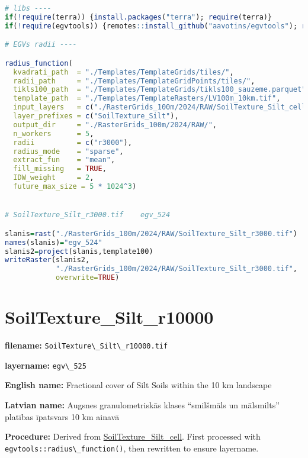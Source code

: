 \documentclass[
]{book}
\newcommand{\passthrough}[1]{#1}
\begin{document}
\begin{lstlisting}[language=R]
# libs ----
if(!require(terra)) {install.packages("terra"); require(terra)}
if(!require(egvtools)) {remotes::install_github("aavotins/egvtools"); require(egvtools)}

# EGVs radii ----

radius_function(
  kvadrati_path  = "./Templates/TemplateGrids/tiles/",
  radii_path     = "./Templates/TemplateGridPoints/tiles/",
  tikls100_path  = "./Templates/TemplateGrids/tikls100_sauzeme.parquet",
  template_path  = "./Templates/TemplateRasters/LV100m_10km.tif",
  input_layers   = c("./RasterGrids_100m/2024/RAW/SoilTexture_Silt_cell.tif"),
  layer_prefixes = c("SoilTexture_Silt"),
  output_dir     = "./RasterGrids_100m/2024/RAW/",
  n_workers      = 5,
  radii          = c("r3000"),
  radius_mode    = "sparse",
  extract_fun    = "mean",
  fill_missing   = TRUE,
  IDW_weight     = 2,
  future_max_size = 5 * 1024^3)


# SoilTexture_Silt_r3000.tif    egv_524

slanis=rast("./RasterGrids_100m/2024/RAW/SoilTexture_Silt_r3000.tif")
names(slanis)="egv_524"
slanis2=project(slanis,template100)
writeRaster(slanis2,
            "./RasterGrids_100m/2024/RAW/SoilTexture_Silt_r3000.tif",
            overwrite=TRUE)
\end{lstlisting}

\section{SoilTexture\_Silt\_r10000}\label{ch06.525}

\textbf{filename:} \passthrough{\lstinline!SoilTexture\_Silt\_r10000.tif!}

\textbf{layername:} \passthrough{\lstinline!egv\_525!}

\textbf{English name:} Fractional cover of Silt Soils within the 10 km landscape

\textbf{Latvian name:} Augsnes granulometriskās klases ``smilšmāls un mālsmilts'' platības īpatsvars 10 km ainavā

\textbf{Procedure:} Derived from \hyperref[ch06.521]{SoilTexture\_Silt\_cell}. First processed
with \passthrough{\lstinline!egvtools::radius\_function()!}, then rewritten to ensure layername.
\end{document}
